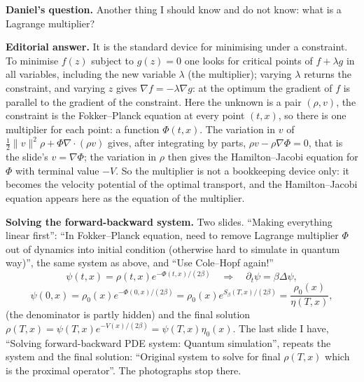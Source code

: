 \medskip\noindent
{\bf Daniel's question.}
Another thing I should know and do not know:
what is a Lagrange multiplier?

\medskip\noindent
{\bf Editorial answer.}
It is the standard device for minimising under
a constraint. To minimise $f(z)$ subject to
$g(z)=0$ one looks for critical points of
$f+\lambda g$ in all variables, including the
new variable $\lambda$ (the multiplier);
varying $\lambda$ returns the constraint, and
varying $z$ gives $\nabla f=-\lambda\nabla g$:
at the optimum the gradient of $f$ is
parallel to the gradient of the constraint.
Here the unknown is a pair $(\rho,v)$, the
constraint is the Fokker--Planck equation at
every point $(t,x)$, so there is one multiplier
for each point: a function $\Phi(t,x)$. The
variation in $v$ of $\frac12\|v\|^2\rho
+\Phi\nabla\cdot(\rho v)$ gives, after
integrating by parts, $\rho v-\rho\nabla\Phi=0$,
that is the slide's $v=\nabla\Phi$; the
variation in $\rho$ then gives the
Hamilton--Jacobi equation for $\Phi$ with
terminal value $-V$. So the multiplier
is not a bookkeeping device only: it becomes
the velocity potential of the optimal
transport, and the Hamilton--Jacobi equation
appears here as the equation of the
multiplier.

\medskip\noindent
{\bf Solving the forward-backward system.}
Two slides. ``Making everything linear first'':
``In Fokker--Planck equation, need to remove
Lagrange multiplier $\Phi$ out of dynamics
into initial condition (otherwise hard to
simulate in quantum way)'', the same system as
above, and ``Use Cole--Hopf again!''
$$
\psi(t,x)=\rho(t,x)e^{-\Phi(t,x)/(2\beta)}
\quad\Longrightarrow\quad
\partial_t\psi=\beta\Delta\psi,
$$
$$
\psi(0,x)=\rho_0(x)e^{-\Phi(0,x)/(2\beta)}
=\rho_0(x)e^{S_\beta(T,x)/(2\beta)}
=\frac{\rho_0(x)}{\eta(T,x)},
$$
(the denominator is partly hidden) and the
final solution
$\rho(T,x)=\psi(T,x)e^{-V(x)/(2\beta)}
=\psi(T,x)\eta_0(x)$. The last slide I have,
``Solving forward-backward PDE system:
Quantum simulation'', repeats the system
and the final solution: ``Original system to
solve for final $\rho(T,x)$ which is the
proximal operator''. The photographs stop
there.

